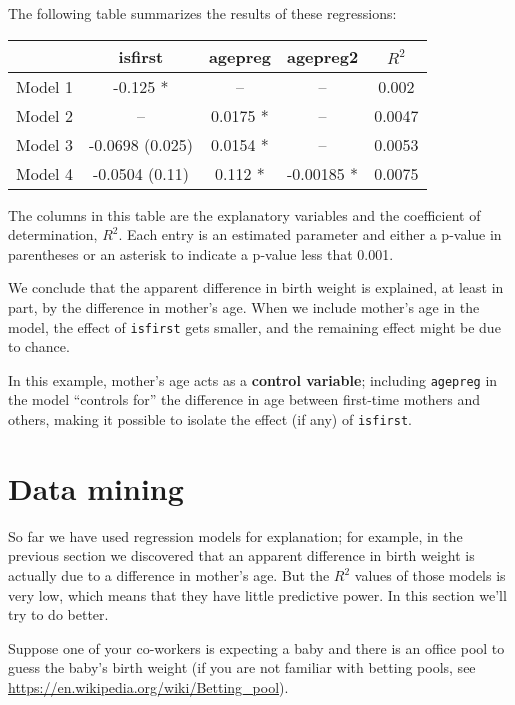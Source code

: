 \documentclass[12pt]{book}
\begin{document}
The following table summarizes the results of these regressions:

\begin{center}
\begin{tabular}{|l|c|c|c|c|}
\hline & isfirst & agepreg & agepreg2 & $R^2$ \\ \hline
Model 1 & -0.125 * & -- & -- & 0.002 \\
Model 2 & -- & 0.0175 * & -- & 0.0047 \\
Model 3 & -0.0698 (0.025) & 0.0154 * & -- & 0.0053 \\
Model 4 & -0.0504 (0.11) & 0.112 * & -0.00185 * & 0.0075 \\
\hline
\end{tabular}
\end{center}

The columns in this table are the explanatory variables and
the coefficient of determination, $R^2$.  Each entry is an estimated
parameter and either a p-value in parentheses or an asterisk to
indicate a p-value less that 0.001.

We conclude that the apparent difference in birth weight
is explained, at least in part, by the difference in mother's age.
When we include mother's age in the model, the effect of
{\tt isfirst} gets smaller, and the remaining effect might be
due to chance.

In this example, mother's age acts as a {\bf control variable};
including {\tt agepreg} in the model ``controls for'' the
difference in age between first-time mothers and others, making
it possible to isolate the effect (if any) of {\tt isfirst}. 


\section{Data mining}
\label{mining}

So far we have used regression models for explanation; for example,
in the previous section we discovered that an apparent difference
in birth weight is actually due to a difference in mother's age.
But the $R^2$ values of those models is very low, which means that
they have little predictive power.  In this section we'll try to
do better.

Suppose one of your co-workers is expecting a baby and
there is an office pool to guess the baby's birth weight (if you are
not familiar with betting pools, see
\url{https://en.wikipedia.org/wiki/Betting_pool}).
\end{document}
